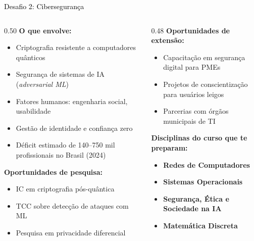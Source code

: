 \documentclass[aspectratio=169]{beamer}
\newcommand{\impt}[1]{\textcolor{morange}{\textbf{#1}}}
\newcommand{\ntc}[1]{\textcolor{mblue}{#1}}
\newcommand{\cc}[1]{\textcolor{mcc}{\textbf{#1}}}
\newcommand{\ia}[1]{\textcolor{mia}{\textbf{#1}}}
\begin{document}
\begin{frame}{\colorbox{dsfcib}{\textcolor{black}{Desafio 2: Cibersegurança}}}
  \footnotesize
  \begin{columns}[T]
    \begin{column}{0.50\textwidth}
      \textbf{O que envolve:}
      \begin{itemize}\setlength\itemsep{3pt}
        \item Criptografia resistente a computadores quânticos
        \item Segurança de sistemas de IA (\emph{adversarial ML})
        \item Fatores humanos: engenharia social, usabilidade
        \item Gestão de identidade e confiança zero
        \item Déficit estimado de 140--750 mil profissionais no Brasil (2024)
      \end{itemize}
      \vspace{0.2cm}
      \textbf{Oportunidades de \impt{pesquisa}:}
      \begin{itemize}\setlength\itemsep{2pt}
        \item IC em criptografia pós-quântica
        \item TCC sobre detecção de ataques com ML
        \item Pesquisa em privacidade diferencial
      \end{itemize}
    \end{column}
    \begin{column}{0.48\textwidth}
      \textbf{Oportunidades de \ntc{extensão}:}
      \begin{itemize}\setlength\itemsep{2pt}
        \item Capacitação em segurança digital para PMEs
        \item Projetos de conscientização para usuários leigos
        \item Parcerias com órgãos municipais de TI
      \end{itemize}
      \vspace{0.2cm}
      \textbf{Disciplinas do curso que te preparam:}
      \begin{itemize}\setlength\itemsep{2pt}
        \item \cc{Redes de Computadores}
        \item \cc{Sistemas Operacionais}
        \item \ia{Segurança, Ética e Sociedade na IA}
        \item \cc{Matemática Discreta}
      \end{itemize}
    \end{column}
  \end{columns}
\end{frame}
\end{document}
